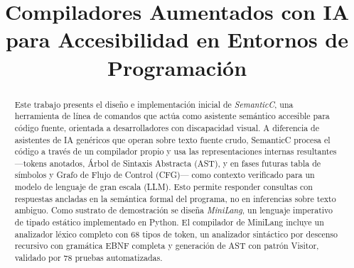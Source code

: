 \documentclass[conference]{IEEEtran}
\begin{document}
\title{Compiladores Aumentados con IA para Accesibilidad en Entornos de Programación\\



}



\author{
\and
{}
}

\maketitle

\begin{abstract}
Este trabajo presents el diseño e implementación inicial de \textit{SemanticC}, una herramienta de línea de comandos que actúa como asistente semántico accesible para código fuente, orientada a desarrolladores con discapacidad visual. A diferencia de asistentes de IA genéricos que operan sobre texto fuente crudo, SemanticC procesa el código a través de un compilador propio y usa las representaciones internas resultantes —tokens anotados, Árbol de Sintaxis Abstracta (AST), y en fases futuras tabla de símbolos y Grafo de Flujo de Control (CFG)— como contexto verificado para un modelo de lenguaje de gran escala (LLM). Esto permite responder consultas con respuestas ancladas en la semántica formal del programa, no en inferencias sobre texto ambiguo. Como sustrato de demostración se diseña \textit{MiniLang}, un lenguaje imperativo de tipado estático implementado en Python. El compilador de MiniLang incluye un analizador léxico completo con 68 tipos de token, un analizador sintáctico por descenso recursivo con gramática EBNF completa y generación de AST con patrón Visitor, validado por 78 pruebas automatizadas. 

\end{abstract}
\end{document}
